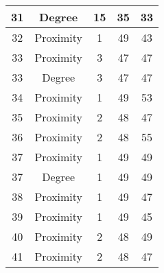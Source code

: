 \documentclass[results.tex]{subfiles}
\begin{document}
\begin{center}
\begin{tabular}{| c || c | c | c | c |}
            \hline
            31                      & Degree                       & 15                     & 35                      & 33                   \\
            \hline
            32                      & Proximity                    & 1                      & 49                      & 43                   \\
            \hline
            33                      & Proximity                    & 3                      & 47                      & 47                   \\
            \hline
            33                      & Degree                       & 3                      & 47                      & 47                   \\
            \hline
            34                      & Proximity                    & 1                      & 49                      & 53                   \\
            \hline
            35                      & Proximity                    & 2                      & 48                      & 47                   \\
            \hline
            36                      & Proximity                    & 2                      & 48                      & 55                   \\
            \hline
            37                      & Proximity                    & 1                      & 49                      & 49                   \\
            \hline
            37                      & Degree                       & 1                      & 49                      & 49                   \\
            \hline
            38                      & Proximity                    & 1                      & 49                      & 47                   \\
            \hline
            39                      & Proximity                    & 1                      & 49                      & 45                   \\
            \hline
            40                      & Proximity                    & 2                      & 48                      & 49                   \\
            \hline
            41                      & Proximity                    & 2                      & 48                      & 47                   \\

\end{tabular}
\end{center}
\end{document}
